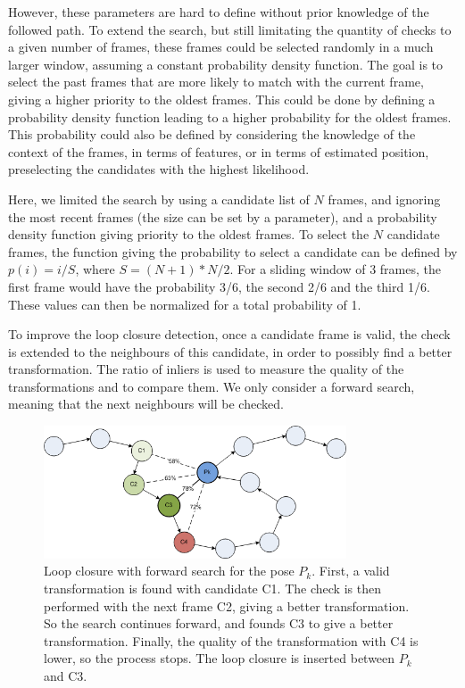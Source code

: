 However, these parameters are hard to define without prior knowledge of the followed path. To extend the search, but still limitating the quantity of checks to a given number of frames, these frames could be selected randomly in a much larger window, assuming a constant probability density function. The goal is to select the past frames that are more likely to match with the current frame, giving a higher priority to the oldest frames. This could be done by defining a probability density function leading to a higher probability for the oldest frames. This probability could also be defined by considering the knowledge of the context of the frames, in terms of features, or in terms of estimated position, preselecting the candidates with the highest likelihood.

Here, we limited the search by using a candidate list of $N$ frames, and ignoring the most recent frames (the size can be set by a parameter), and a probability density function giving priority to the oldest frames. To select the $N$ candidate frames, the function giving the probability to select a candidate can be defined by $p(i) = i/S$, where $S=(N+1)*N/2$. For a sliding window of 3 frames, the first frame would have the probability 3/6, the second 2/6 and the third 1/6. These values can then be normalized for a total probability of 1.

To improve the loop closure detection, once a candidate frame is valid, the check is extended to the neighbours of this candidate, in order to possibly find a better transformation. The ratio of inliers is used to measure the quality of the transformations and to compare them. We only consider a forward search, meaning that the next neighbours will be checked.

\begin{figure}[H]
\centering
 \includegraphics[width=0.8\textwidth]{figures/graph_lc_candidate_2}
\caption{Loop closure with forward search for the pose $P_k$. First, a valid transformation is found with candidate C1. The check is then performed with the next frame C2, giving a better transformation. So the search continues forward, and founds C3 to give a better transformation. Finally, the quality of the transformation with C4 is lower, so the process stops. The loop closure is inserted between $P_k$ and C3.}
\end{figure}

